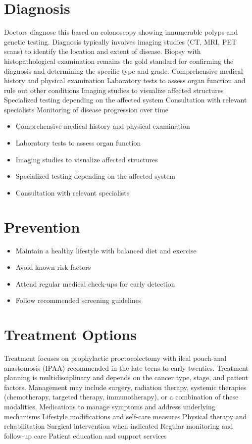 \section{Diagnosis}
Doctors diagnose this based on colonoscopy showing innumerable polyps and genetic testing. Diagnosis typically involves imaging studies (CT, MRI, PET scans) to identify the location and extent of disease. Biopsy with histopathological examination remains the gold standard for confirming the diagnosis and determining the specific type and grade. Comprehensive medical history and physical examination Laboratory tests to assess organ function and rule out other conditions Imaging studies to visualize affected structures Specialized testing depending on the affected system Consultation with relevant specialists Monitoring of disease progression over time

\begin{itemize}[noitemsep]
  \item Comprehensive medical history and physical examination
  \item Laboratory tests to assess organ function
  \item Imaging studies to visualize affected structures
  \item Specialized testing depending on the affected system
  \item Consultation with relevant specialists
\end{itemize}
\section{Prevention}
\begin{itemize}[noitemsep]
  \item Maintain a healthy lifestyle with balanced diet and exercise
  \item Avoid known risk factors
  \item Attend regular medical check-ups for early detection
  \item Follow recommended screening guidelines
\end{itemize}
\section{Treatment Options}
Treatment focuses on prophylactic proctocolectomy with ileal pouch-anal anastomosis (IPAA) recommended in the late teens to early twenties. Treatment planning is multidisciplinary and depends on the cancer type, stage, and patient factors. Management may include surgery, radiation therapy, systemic therapies (chemotherapy, targeted therapy, immunotherapy), or a combination of these modalities. Medications to manage symptoms and address underlying mechanisms Lifestyle modifications and self-care measures Physical therapy and rehabilitation Surgical intervention when indicated Regular monitoring and follow-up care Patient education and support services

